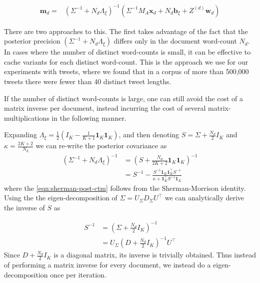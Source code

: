 \documentclass[10pt,fleqn]{article}
\newcommand \halve[1] {
	\frac{#1}{2}
}
\newcommand \half {
    \halve{1}
}
\newcommand \T { ^\top }
\newcommand \vv[1] { \bm #1 }
\newcommand \Axi { { \Lambda_{\xi} } }
\newcommand \bxi { { \vv{b}_{\xi} } }
\newcommand \xd      { { \vv x_d } }
\newcommand \inv[1] { {#1}^{-1} }
\newcommand \invb[1] { \inv{\left( #1 \right)} }
\newcommand \md   { \vv{m}_d }
\newcommand \oneover[1] {
    \frac{1}{ {#1} }
}
\begin{document}
\begin{appendices}
\begin{align}
 \md = & \invb{\inv{\Sigma} + N_d \Axi} \left(\inv{\Sigma} M_A \xd  + N_d \bxi + Z^{(d)}\vv{w}_d \right )
\end{align}

There are two approaches to this. The first takes advantage of the fact that the posterior precision $(\inv{\Sigma} + N_d \Axi)$ differs only in the document word-count $N_d$. In cases where the number of distinct word-counts is small, it can be effective to cache variants for each distinct word-count. This is the approach we use for our experiments with tweets, where  we found that in a corpus of more than 500,000 tweets there were fewer than 40 distinct tweet lengths.

If the number of distinct word-counts is large, one can still avoid the cost of a matrix inverse per document, instead incurring the cost of several matrix-multiplications in the following manner.

Expanding $\Axi = \half(I_K - \oneover{K+1} \mathbf{1}_K \mathbf{1}_K)$, and then denoting $S = \Sigma + \halve{N_d} I_K$ and $\kappa = \frac{2K + 2}{N_d}$ we can re-write the posterior covariance as
\begin{align}
\invb{\inv{\Sigma} + N_d \Axi} & =
\invb{S + \frac{N_d}{2K + 2} \mathbf{1}_K \mathbf{1}_K} \\
& = \inv{S} - \frac{\inv{S}\mathbf{1}_K\mathbf{1}_K^\top\inv{S}}{\kappa+ \mathbf{1}_K^\top \inv{S} \mathbf{1}_K} \label{eqn:sherman-post-ctm}
\end{align}
where the \eqref{eqn:sherman-post-ctm} follows from the Sherman-Morrison identity. Using the the eigen-decomposition of $\Sigma = U_\Sigma D_\Sigma U\T$ we can analytically derive the inverse of $S$ as

\begin{align}
\inv{S} 
& = \invb{\Sigma + \halve{N_d}I_K} \\
& = U_\Sigma \invb{D + \halve{N_d}I_K} U\T
\end{align}
Since $D + \halve{N_d}I_K$ is a diagonal matrix, its inverse is trivially obtained. Thus instead of performing a matrix inverse for every document, we instead do a eigen-decomposition once per iteration.
\end{appendices}
\end{document}
